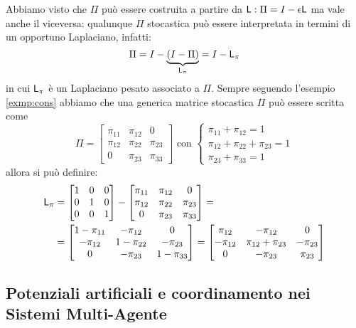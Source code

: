 Abbiamo visto che $\Pi$ pu\`o essere costruita a partire da $\mathsf{L}: \Pi = I - \epsilon \mathsf{L}$ ma vale anche il viceversa: qualunque $\Pi$ stocastica pu\`o essere interpretata in termini di un opportuno Laplaciano, infatti:
\begin{equation}
\label{consmat}
\Pi = I - \underbrace{(I - \Pi)}_{\mathsf{L}_{\pi}} = I - \mathsf{L}_{\pi}
\end{equation} in cui $\mathsf{L}_{\pi}$ \`e un Laplaciano pesato associato a $\Pi$.
Sempre seguendo l'esempio \ref{exmp:cons} abbiamo che una generica matrice stocastica $\Pi$ pu\`o essere scritta come
\begin{equation}
\Pi = \begin{bmatrix}
\pi_{11} & \pi_{12} & 0 \\
\pi_{12} & \pi_{22} & \pi_{23} \\
0 & \pi_{23} & \pi_{33}
\end{bmatrix} \text{ con } \begin{cases} \pi_{11} + \pi_{12} = 1 \\ \pi_{12} + \pi_{22} + \pi_{23} = 1 \\ \pi_{23} + \pi_{33} = 1
\end{cases}
\end{equation} allora si pu\`o definire:
\begin{align*}
\mathsf{L}_{\pi} &= \begin{bmatrix}
1 & 0 & 0 \\
0 & 1 & 0 \\
0 & 0 & 1
\end{bmatrix} - \begin{bmatrix}
\pi_{11} & \pi_{12} & 0 \\
\pi_{12} & \pi_{22} & \pi_{23} \\
0 & \pi_{23} & \pi_{33}
\end{bmatrix} = \\ 
&= \begin{bmatrix}
1- \pi_{11} & -\pi_{12} & 0 \\
-\pi_{12} & 1-\pi_{22} & -\pi_{23} \\
0 & -\pi_{23} & 1-\pi_{33}
\end{bmatrix} = \begin{bmatrix}
\pi_{12} & -\pi_{12} & 0 \\
-\pi_{12} & \pi_{12} + \pi_{23} & -\pi_{23} \\
0 & -\pi_{23} & \pi_{23}
\end{bmatrix}
\end{align*}

\subsection{Potenziali artificiali e coordinamento nei Sistemi Multi-Agente}

